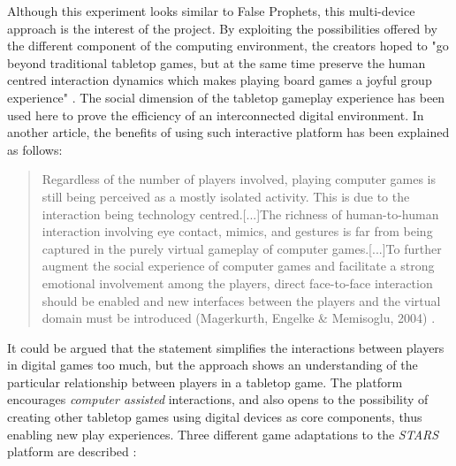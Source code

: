 Although this experiment looks similar to False Prophets, this multi-device approach is the interest of the project. By exploiting the possibilities offered by the different component of the computing environment, the creators hoped to "go beyond traditional tabletop games, but at the same time preserve the human centred interaction dynamics which makes playing board games a joyful group experience" \cite{art:stars}. The social dimension of the tabletop gameplay experience has been used here to prove the efficiency of an interconnected digital environment. In another article, the benefits of using such interactive platform has been explained as follows:

\begin{quotation}
Regardless of the number of players involved, playing computer games is still being perceived as a mostly isolated activity. This is due to the interaction being technology centred.[...]The richness of human-to-human interaction
involving eye contact, mimics, and gestures is far from being captured in the purely virtual gameplay of computer games.[...]To further augment the social experience of computer games and facilitate a strong emotional involvement among the players, direct face-to-face interaction should be enabled and new interfaces between the players and the virtual domain must be introduced (Magerkurth, Engelke \& Memisoglu, 2004) \cite{art:stars2}.
\end{quotation}

It could be argued that the statement simplifies the interactions between players in digital games too much, but the approach shows an understanding of the particular relationship between players in a tabletop game. The platform encourages \textit{computer assisted} interactions, and also opens to the possibility of creating other tabletop games using digital devices as core components, thus enabling new play experiences. Three different game adaptations to the \textit{STARS} platform are described \cite{art:stars2}:

